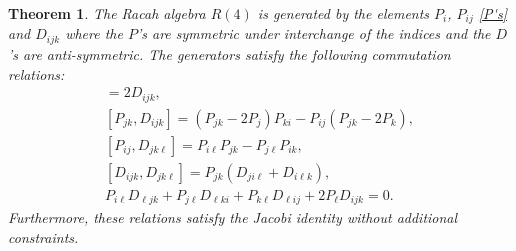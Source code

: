 \documentclass[10pt,a4paper]{amsart}
\numberwithin{equation}{section}
\newtheorem{Theorem}{Theorem}[section]
\begin{document}
\begin{Theorem}
\label{bigthm} The Racah algebra $R(4)$ is generated by the elements $P_i$, $P_{ij}$ \eqref{P's} and $D_{ijk}$ where the $P$'s are symmetric under interchange of the indices and the $D$'s are anti-symmetric. The generators satisfy the following commutation relations:
\begin{gather}
[P_{ij}, P_{jk}]=2 D_{ijk}, \label{Ddef}\\
[P_{jk},D_{ijk}]= \left(P_{jk}-2P_j\right)P_{ki}-P_{ij}\left(P_{jk}-2P_{k}\right),\label{innerT}\\
[P_{ij}, D_{jk\ell}] =P_{i\ell}P_{jk}-P_{j\ell}P_{ik},\label{outerT}\\
 [D_{ijk}, D_{jk\ell}] = P_{jk}\left(D_{ji\ell} +D_{i\ell k}\right), \label{DDT}\\
P_{i\ell}D_{\ell jk}+ P_{j\ell} D_{\ell ki}+P_{k\ell}D_{\ell ij}+2P_{\ell}D_{ijk}=0.\label{PDT}
\end{gather}
Furthermore, these relations satisfy the Jacobi identity without additional constraints.
\end{Theorem}
\end{document}
